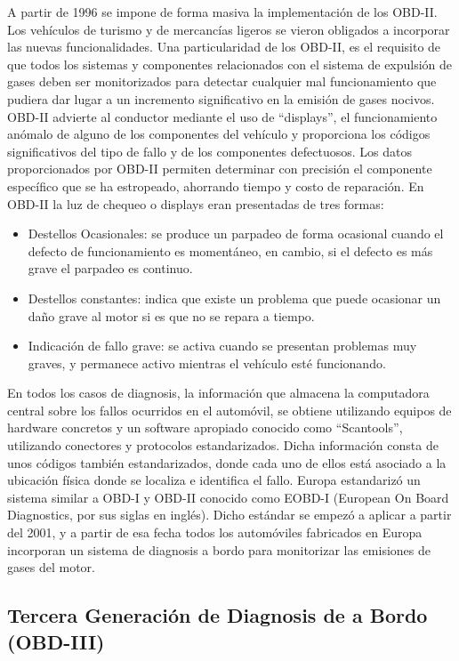 A partir de 1996 se impone de forma masiva la implementación de los OBD-II. Los vehículos de turismo y de mercancías ligeros se vieron obligados a incorporar las nuevas funcionalidades. Una particularidad de los OBD-II, es el requisito de que todos los sistemas y componentes relacionados con el sistema de expulsión de gases deben ser monitorizados para detectar cualquier mal funcionamiento que pudiera dar lugar a un incremento significativo en la emisión de gases nocivos. 
OBD-II advierte al conductor mediante  el uso de “displays”, el funcionamiento anómalo de alguno de los componentes del vehículo y proporciona los códigos significativos del tipo de fallo y de los componentes defectuosos. Los datos proporcionados por OBD-II permiten determinar con precisión el componente específico que se ha estropeado, ahorrando tiempo y costo de reparación. 
En OBD-II la luz de chequeo o displays eran presentadas de tres formas:
\begin{itemize}
\item Destellos Ocasionales: se produce un parpadeo de forma ocasional cuando el defecto de funcionamiento es momentáneo, en cambio, si el defecto es más grave el parpadeo es continuo.
\item Destellos constantes: indica que existe un problema que puede ocasionar un daño grave al motor si es que no se repara a tiempo. 
\item Indicación de fallo grave: se activa cuando se presentan problemas muy graves, y permanece activo mientras el vehículo esté funcionando.
\end{itemize}

En todos los casos de diagnosis, la información que almacena la computadora central sobre los fallos ocurridos en el automóvil, se obtiene utilizando equipos de hardware concretos y un software apropiado conocido como “Scantools”, utilizando conectores y protocolos estandarizados.
Dicha información consta de unos códigos también estandarizados, donde cada uno de ellos está asociado a la ubicación física donde se localiza e identifica el fallo.
Europa estandarizó un sistema similar a OBD-I y OBD-II conocido como EOBD-I (European On Board Diagnostics, por sus siglas en inglés). Dicho estándar se empezó a aplicar a partir del 2001, y a partir de esa fecha todos los automóviles fabricados en Europa incorporan un sistema de diagnosis a bordo para monitorizar las emisiones de gases del motor.

\subsection {Tercera Generación de Diagnosis de a Bordo (OBD-III)}


